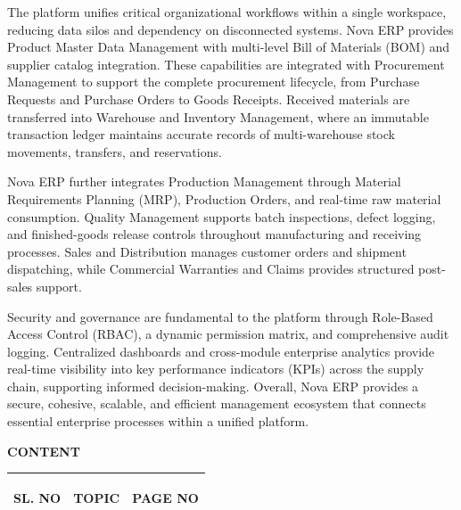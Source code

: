 \documentclass[12pt,a4paper]{report}
\makeatletter
\gdef\tocrows{}
\newcommand{\tocstart}{\@starttoc{toc}}
\newcommand{\contenttable}{%
  \begin{center}{\bfseries\fontsize{16}{20}\selectfont CONTENT\par}\end{center}
  \vspace{4pt}
  \tocstart
  \begingroup\setstretch{1.0}\small\renewcommand{\arraystretch}{1.3}
  \begin{longtable}{|>{\bfseries\centering\arraybackslash}p{1.9cm}|>{\bfseries\raggedright\arraybackslash}p{9.6cm}|>{\bfseries\centering\arraybackslash}p{2.3cm}|}
  \hline \textbf{SL. NO}&\textbf{TOPIC}&\textbf{PAGE NO}\\\hline\endhead
  \tocrows
  \end{longtable}\endgroup}
\makeatother
\begin{document}
The platform unifies critical organizational workflows within a single workspace, reducing data silos and dependency on disconnected systems. Nova ERP provides Product Master Data Management with multi-level Bill of Materials (BOM) and supplier catalog integration. These capabilities are integrated with Procurement Management to support the complete procurement lifecycle, from Purchase Requests and Purchase Orders to Goods Receipts. Received materials are transferred into Warehouse and Inventory Management, where an immutable transaction ledger maintains accurate records of multi-warehouse stock movements, transfers, and reservations.

Nova ERP further integrates Production Management through Material Requirements Planning (MRP), Production Orders, and real-time raw material consumption. Quality Management supports batch inspections, defect logging, and finished-goods release controls throughout manufacturing and receiving processes. Sales and Distribution manages customer orders and shipment dispatching, while Commercial Warranties and Claims provides structured post-sales support.

Security and governance are fundamental to the platform through Role-Based Access Control (RBAC), a dynamic permission matrix, and comprehensive audit logging. Centralized dashboards and cross-module enterprise analytics provide real-time visibility into key performance indicators (KPIs) across the supply chain, supporting informed decision-making. Overall, Nova ERP provides a secure, cohesive, scalable, and efficient management ecosystem that connects essential enterprise processes within a unified platform.
\clearpage

\contenttable
\clearpage
\end{document}
